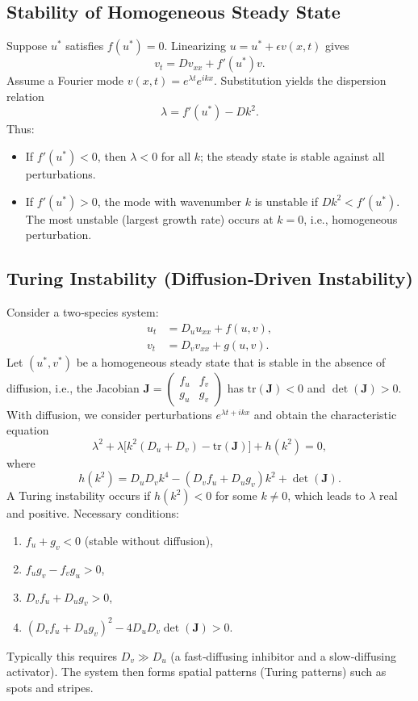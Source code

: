 \documentclass[12pt,a4paper]{book}
\begin{document}
\subsection{Stability of Homogeneous Steady State}
Suppose $u^*$ satisfies $f(u^*) = 0$. Linearizing $u = u^* + \epsilon v(x,t)$ gives
\[
v_t = D v_{xx} + f'(u^*) v.
\]
Assume a Fourier mode $v(x,t) = e^{\lambda t} e^{i k x}$. Substitution yields the dispersion relation
\[
\lambda = f'(u^*) - D k^2.
\]
Thus:
\begin{itemize}
    \item If $f'(u^*) < 0$, then $\lambda < 0$ for all $k$; the steady state is stable against all perturbations.
    \item If $f'(u^*) > 0$, the mode with wavenumber $k$ is unstable if $D k^2 < f'(u^*)$. The most unstable (largest growth rate) occurs at $k=0$, i.e., homogeneous perturbation.
\end{itemize}

\subsection{Turing Instability (Diffusion‑Driven Instability)}
Consider a two‑species system:
\begin{align*}
u_t &= D_u u_{xx} + f(u,v),\\
v_t &= D_v v_{xx} + g(u,v).
\end{align*}
Let $(u^*,v^*)$ be a homogeneous steady state that is stable in the absence of diffusion, i.e., the Jacobian $\mathbf{J} = \begin{pmatrix} f_u & f_v \\ g_u & g_v \end{pmatrix}$ has $\text{tr}(\mathbf{J}) < 0$ and $\det(\mathbf{J}) > 0$. With diffusion, we consider perturbations $e^{\lambda t + i k x}$ and obtain the characteristic equation
\[
\lambda^2 + \lambda\bigl[k^2(D_u+D_v) - \text{tr}(\mathbf{J})\bigr] + h(k^2) = 0,
\]
where
\[
h(k^2) = D_u D_v k^4 - (D_v f_u + D_u g_v) k^2 + \det(\mathbf{J}).
\]
A Turing instability occurs if $h(k^2) < 0$ for some $k \neq 0$, which leads to $\lambda$ real and positive. Necessary conditions:
\begin{enumerate}
    \item $f_u + g_v < 0$ (stable without diffusion),
    \item $f_u g_v - f_v g_u > 0$,
    \item $D_v f_u + D_u g_v > 0$,
    \item $(D_v f_u + D_u g_v)^2 - 4 D_u D_v \det(\mathbf{J}) > 0$.
\end{enumerate}
Typically this requires $D_v \gg D_u$ (a fast‑diffusing inhibitor and a slow‑diffusing activator). The system then forms spatial patterns (Turing patterns) such as spots and stripes.
\end{document}
